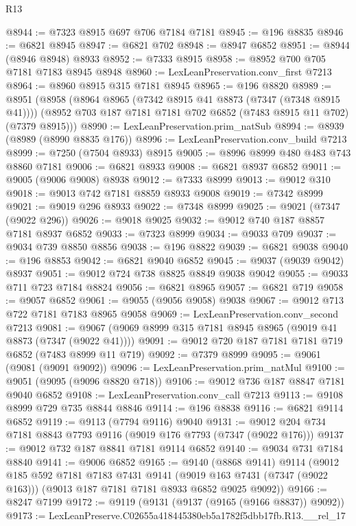 \begin{lexlean}{R13}
\begin{coremodule}
@8944 := @7323 @8915 @697 @706 @7184 @7181
@8945 := @196 @8835
@8946 := @6821 @8945
@8947 := @6821 @702
@8948 := @8947 @6852
@8951 := @8944 (@8946 @8948) @8933
@8952 := @7333 @8915
@8958 := @8952 @700 @705 @7181 @7183 @8945 @8948
@8960 := LexLeanPreservation.conv_first @7213
@8964 := @8960 @8915 @315 @7181 @8945
@8965 := @196 @8820
@8989 := @8951
    (@8958
      (@8964 @8965 (@7342 @8915 @41 @8873 (@7347 (@7348 @8915 @41))))
      (@8952 @703 @187 @7181 @7181 @702 @6852 (@7483 @8915 @11 @702) (@7379 @8915)))
@8990 := LexLeanPreservation.prim_natSub
@8994 := @8939 (@8989 (@8990 @8835 @176))
@8996 := LexLeanPreservation.conv_build @7213
@8999 := @7250 (@7504 @8933) @8915
@9005 := @8996 @8999 @480 @483 @743 @8860 @7181
@9006 := @6821 @8933
@9008 := @6821 @8937 @6852
@9011 := @9005 (@9006 @9008) @8938
@9012 := @7333 @8999
@9013 := @9012 @310
@9018 := @9013 @742 @7181 @8859 @8933 @9008
@9019 := @7342 @8999
@9021 := @9019 @296 @8933
@9022 := @7348 @8999
@9025 := @9021 (@7347 (@9022 @296))
@9026 := @9018 @9025
@9032 := @9012 @740 @187 @8857 @7181 @8937 @6852
@9033 := @7323 @8999
@9034 := @9033 @709
@9037 := @9034 @739 @8850 @8856
@9038 := @196 @8822
@9039 := @6821 @9038
@9040 := @196 @8853
@9042 := @6821 @9040 @6852
@9045 := @9037 (@9039 @9042) @8937
@9051 := @9012 @724 @738 @8825 @8849 @9038 @9042
@9055 := @9033 @711 @723 @7184 @8824
@9056 := @6821 @8965
@9057 := @6821 @719
@9058 := @9057 @6852
@9061 := @9055 (@9056 @9058) @9038
@9067 := @9012 @713 @722 @7181 @7183 @8965 @9058
@9069 := LexLeanPreservation.conv_second @7213
@9081 := @9067 (@9069 @8999 @315 @7181 @8945 @8965 (@9019 @41 @8873 (@7347 (@9022 @41))))
@9091 := @9012 @720 @187 @7181 @7181 @719 @6852 (@7483 @8999 @11 @719)
@9092 := @7379 @8999
@9095 := @9061 (@9081 (@9091 @9092))
@9096 := LexLeanPreservation.prim_natMul
@9100 := @9051 (@9095 (@9096 @8820 @718))
@9106 := @9012 @736 @187 @8847 @7181 @9040 @6852
@9108 := LexLeanPreservation.conv_call @7213
@9113 := @9108 @8999 @729 @735 @8844 @8846
@9114 := @196 @8838
@9116 := @6821 @9114 @6852
@9119 := @9113 (@7794 @9116) @9040
@9131 := @9012 @204 @734 @7181 @8843 @7793 @9116 (@9019 @176 @7793 (@7347 (@9022 @176)))
@9137 := @9012 @732 @187 @8841 @7181 @9114 @6852
@9140 := @9034 @731 @7184 @8840
@9141 := @9006 @6852
@9165 := @9140
    (@8868 @9141)
    @9114
    (@9012
      @185
      @592
      @7181
      @7183
      @7431
      @9141
      (@9019 @163 @7431 (@7347 (@9022 @163)))
      (@9013 @187 @7181 @7181 @8933 @6852 @9025 @9092))
@9166 := @8247 @7199
@9172 := @9119 (@9131 (@9137 (@9165 (@9166 @8837)) @9092))
@9173 := LexLeanPreserve.C02655a418445380eb5a1782f5dbb17fb.R13.__rel_17

\end{coremodule}
\end{lexlean}
